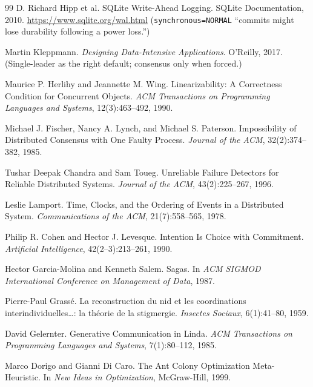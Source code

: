 \documentclass[11pt,a4paper]{article}
\theoremstyle{definition}
\theoremstyle{remark}
\begin{document}
\begin{thebibliography}{99}
D. Richard Hipp et al.
\newblock SQLite Write-Ahead Logging.
\newblock SQLite Documentation, 2010.
\newblock \url{https://www.sqlite.org/wal.html}
\newblock (\texttt{synchronous=NORMAL} ``commits might lose durability following a power loss.'')

Martin Kleppmann.
\newblock \textit{Designing Data-Intensive Applications}.
\newblock O'Reilly, 2017.
\newblock (Single-leader as the right default; consensus only when forced.)

Maurice P. Herlihy and Jeannette M. Wing.
\newblock Linearizability: A Correctness Condition for Concurrent Objects.
\newblock \textit{ACM Transactions on Programming Languages and Systems}, 12(3):463--492, 1990.

Michael J. Fischer, Nancy A. Lynch, and Michael S. Paterson.
\newblock Impossibility of Distributed Consensus with One Faulty Process.
\newblock \textit{Journal of the ACM}, 32(2):374--382, 1985.

Tushar Deepak Chandra and Sam Toueg.
\newblock Unreliable Failure Detectors for Reliable Distributed Systems.
\newblock \textit{Journal of the ACM}, 43(2):225--267, 1996.

Leslie Lamport.
\newblock Time, Clocks, and the Ordering of Events in a Distributed System.
\newblock \textit{Communications of the ACM}, 21(7):558--565, 1978.

Philip R. Cohen and Hector J. Levesque.
\newblock Intention Is Choice with Commitment.
\newblock \textit{Artificial Intelligence}, 42(2--3):213--261, 1990.

Hector Garcia-Molina and Kenneth Salem.
\newblock Sagas.
\newblock In \textit{ACM SIGMOD International Conference on Management of Data}, 1987.

Pierre-Paul Grass\'e.
\newblock La reconstruction du nid et les coordinations interindividuelles\ldots: la th\'eorie de la stigmergie.
\newblock \textit{Insectes Sociaux}, 6(1):41--80, 1959.

David Gelernter.
\newblock Generative Communication in Linda.
\newblock \textit{ACM Transactions on Programming Languages and Systems}, 7(1):80--112, 1985.

Marco Dorigo and Gianni Di Caro.
\newblock The Ant Colony Optimization Meta-Heuristic.
\newblock In \textit{New Ideas in Optimization}, McGraw-Hill, 1999.


\end{thebibliography}
\end{document}
